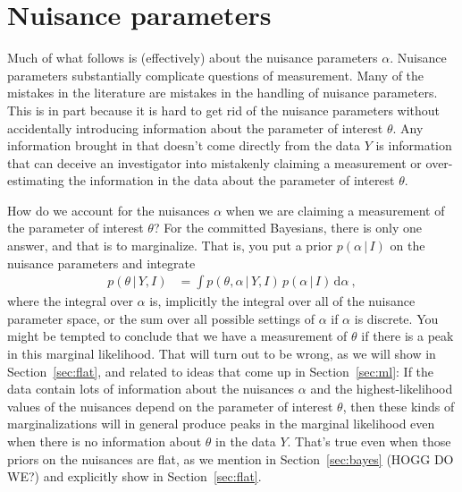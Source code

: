 \documentclass{article}
\newcommand{\sectionname}{Section}
\newcommand{\secref}[1]{\sectionname~\ref{#1}}
\newcommand{\dd}{\mathrm{d}}
\newcommand{\given}{\,|\,}
\begin{document}
\section{Nuisance parameters}\label{sec:nuisance}

Much of what follows is (effectively) about the nuisance parameters $\alpha$.
Nuisance parameters substantially complicate questions of measurement.
Many of the mistakes in the literature are mistakes in the handling of nuisance parameters.
This is in part because it is hard to get rid of the nuisance parameters without accidentally introducing information about the parameter of interest $\theta$.
Any information brought in that doesn't come directly from the data $Y$ is information that can deceive an investigator into mistakenly claiming a measurement or over-estimating the information in the data about the parameter of interest $\theta$.

How do we account for the nuisances $\alpha$ when we are claiming a measurement of the parameter of interest $\theta$?
For the committed Bayesians, there is only one answer, and that is to marginalize.
That is, you put a prior $p(\alpha\given I)$ on the nuisance parameters and integrate
\begin{align}
    p(\theta\given Y,I) &= \int p(\theta,\alpha\given Y,I)\,p(\alpha\given I)\,\dd\alpha ~,\label{eq:marginallf}
\end{align}
where the integral over $\alpha$ is, implicitly the integral over all of the nuisance parameter space, or the sum over all possible settings of $\alpha$ if $\alpha$ is discrete.
You might be tempted to conclude that we have a measurement of $\theta$ if there is a peak in this marginal likelihood.
That will turn out to be wrong, as we will show in \secref{sec:flat}, and related to ideas that come up in \secref{sec:ml}:
If the data contain lots of information about the nuisances $\alpha$ and the highest-likelihood values of the nuisances depend on the parameter of interest $\theta$, then these kinds of marginalizations will in general produce peaks in the marginal likelihood even when there is no information about $\theta$ in the data $Y$.
That's true even when those priors on the nuisances are flat, as we mention in \secref{sec:bayes} (HOGG DO WE?) and explicitly show in \secref{sec:flat}.
\end{document}
